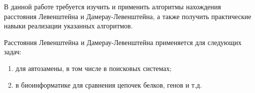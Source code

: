 \Introduction
    В данной работе требуется изучить и применить алгоритмы нахождения 
    расстояния Левенштейна и Дамерау-Левенштейна, а также получить
    практические навыки реализации указанных алгоритмов.
    
    Расстояния Левенштейна и Дамерау-Левенштейна применяется для следующих задач: \begin{enumerate}
        \item для автозамены, в том числе в поисковых системах;
        \item в биоинформатике для сравнения цепочек белков, генов и т.д.
    \end{enumerate}
\newpage